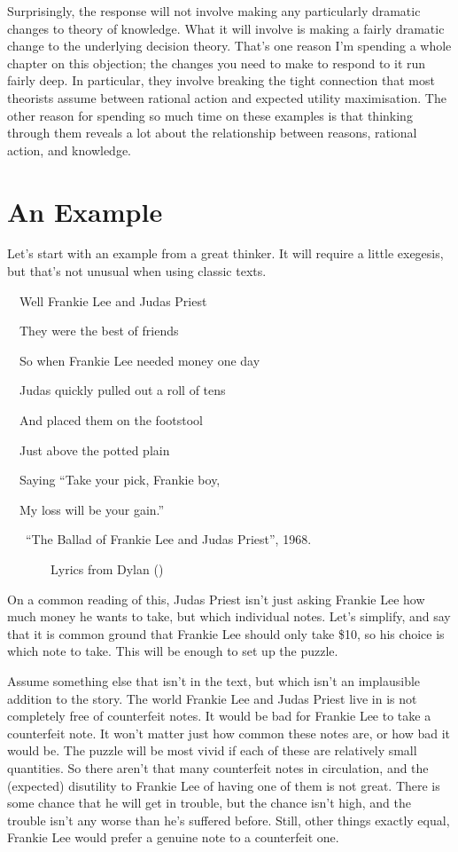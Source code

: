 \documentclass[
  10pt,
  letterpaper,
  twoside]{scrbook}
\begin{document}
Surprisingly, the response will not involve making any particularly
dramatic changes to theory of knowledge. What it will involve is making
a fairly dramatic change to the underlying decision theory. That's one
reason I'm spending a whole chapter on this objection; the changes you
need to make to respond to it run fairly deep. In particular, they
involve breaking the tight connection that most theorists assume between
rational action and expected utility maximisation. The other reason for
spending so much time on these examples is that thinking through them
reveals a lot about the relationship between reasons, rational action,
and knowledge.

\section{An Example}\label{sec-frankielee}

Let's start with an example from a great thinker. It will require a
little exegesis, but that's not unusual when using classic texts.

~~Well Frankie Lee and Judas Priest ~\\
\strut ~~They were the best of friends ~\\
\strut ~~So when Frankie Lee needed money one day ~\\
\strut ~~Judas quickly pulled out a roll of tens ~\\
\strut ~~And placed them on the footstool ~\\
\strut ~~Just above the potted plain ~\\
\strut ~~Saying ``Take your pick, Frankie boy, ~\\
\strut ~~My loss will be your gain.'' ~\\
\strut ~~~``The Ballad of Frankie Lee and Judas Priest'', 1968.\\
\strut ~~~~~~~Lyrics from Dylan ()

On a common reading of this, Judas Priest isn't just asking Frankie Lee
how much money he wants to take, but which individual notes. Let's
simplify, and say that it is common ground that Frankie Lee should only
take \$10, so his choice is which note to take. This will be enough to
set up the puzzle.

Assume something else that isn't in the text, but which isn't an
implausible addition to the story. The world Frankie Lee and Judas
Priest live in is not completely free of counterfeit notes. It would be
bad for Frankie Lee to take a counterfeit note. It won't matter just how
common these notes are, or how bad it would be. The puzzle will be most
vivid if each of these are relatively small quantities. So there aren't
that many counterfeit notes in circulation, and the (expected)
disutility to Frankie Lee of having one of them is not great. There is
some chance that he will get in trouble, but the chance isn't high, and
the trouble isn't any worse than he's suffered before. Still, other
things exactly equal, Frankie Lee would prefer a genuine note to a
counterfeit one.
\end{document}
